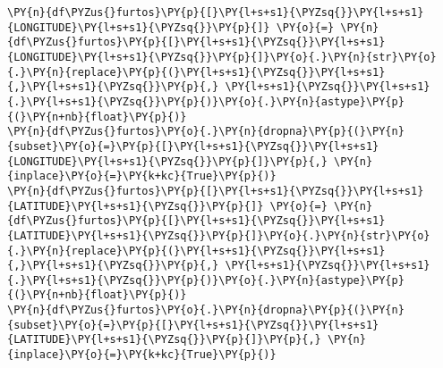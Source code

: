     \begin{tcolorbox}[breakable, size=fbox, boxrule=1pt, pad at break*=1mm,colback=cellbackground, colframe=cellborder]
\begin{Verbatim}[commandchars=\\\{\}]
\PY{n}{df\PYZus{}furtos}\PY{p}{[}\PY{l+s+s1}{\PYZsq{}}\PY{l+s+s1}{LONGITUDE}\PY{l+s+s1}{\PYZsq{}}\PY{p}{]} \PY{o}{=} \PY{n}{df\PYZus{}furtos}\PY{p}{[}\PY{l+s+s1}{\PYZsq{}}\PY{l+s+s1}{LONGITUDE}\PY{l+s+s1}{\PYZsq{}}\PY{p}{]}\PY{o}{.}\PY{n}{str}\PY{o}{.}\PY{n}{replace}\PY{p}{(}\PY{l+s+s1}{\PYZsq{}}\PY{l+s+s1}{,}\PY{l+s+s1}{\PYZsq{}}\PY{p}{,} \PY{l+s+s1}{\PYZsq{}}\PY{l+s+s1}{.}\PY{l+s+s1}{\PYZsq{}}\PY{p}{)}\PY{o}{.}\PY{n}{astype}\PY{p}{(}\PY{n+nb}{float}\PY{p}{)}
\PY{n}{df\PYZus{}furtos}\PY{o}{.}\PY{n}{dropna}\PY{p}{(}\PY{n}{subset}\PY{o}{=}\PY{p}{[}\PY{l+s+s1}{\PYZsq{}}\PY{l+s+s1}{LONGITUDE}\PY{l+s+s1}{\PYZsq{}}\PY{p}{]}\PY{p}{,} \PY{n}{inplace}\PY{o}{=}\PY{k+kc}{True}\PY{p}{)}
\PY{n}{df\PYZus{}furtos}\PY{p}{[}\PY{l+s+s1}{\PYZsq{}}\PY{l+s+s1}{LATITUDE}\PY{l+s+s1}{\PYZsq{}}\PY{p}{]} \PY{o}{=} \PY{n}{df\PYZus{}furtos}\PY{p}{[}\PY{l+s+s1}{\PYZsq{}}\PY{l+s+s1}{LATITUDE}\PY{l+s+s1}{\PYZsq{}}\PY{p}{]}\PY{o}{.}\PY{n}{str}\PY{o}{.}\PY{n}{replace}\PY{p}{(}\PY{l+s+s1}{\PYZsq{}}\PY{l+s+s1}{,}\PY{l+s+s1}{\PYZsq{}}\PY{p}{,} \PY{l+s+s1}{\PYZsq{}}\PY{l+s+s1}{.}\PY{l+s+s1}{\PYZsq{}}\PY{p}{)}\PY{o}{.}\PY{n}{astype}\PY{p}{(}\PY{n+nb}{float}\PY{p}{)}
\PY{n}{df\PYZus{}furtos}\PY{o}{.}\PY{n}{dropna}\PY{p}{(}\PY{n}{subset}\PY{o}{=}\PY{p}{[}\PY{l+s+s1}{\PYZsq{}}\PY{l+s+s1}{LATITUDE}\PY{l+s+s1}{\PYZsq{}}\PY{p}{]}\PY{p}{,} \PY{n}{inplace}\PY{o}{=}\PY{k+kc}{True}\PY{p}{)}
\end{Verbatim}
\end{tcolorbox}


